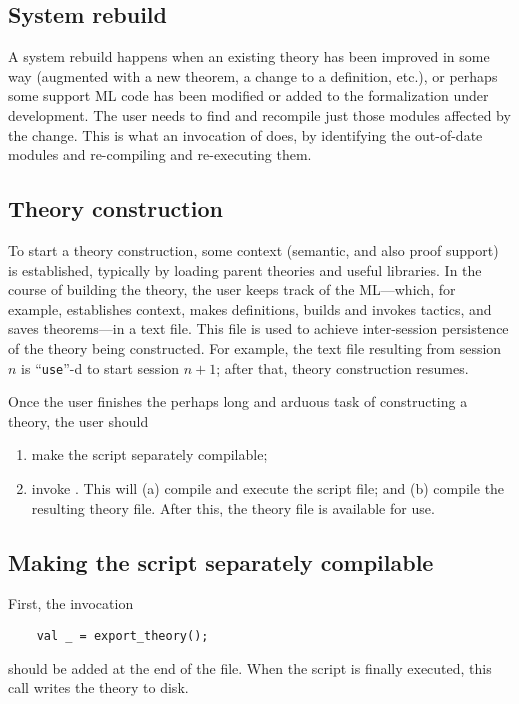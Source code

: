 \subsection{System rebuild}

A system rebuild happens when an existing theory has been improved in
some way (augmented with a new theorem, a change to a definition,
etc.), or perhaps some support ML code has been modified or added to
the formalization under development. The user needs to find and
recompile just those modules affected by the change. This is what an
invocation of \holmake{} does, by identifying the out-of-date modules
and re-compiling and re-executing them.


\subsection{Theory construction}

To start a theory construction, some context (semantic, and also proof
support) is established, typically by loading parent theories and
useful libraries. In the course of building the theory, the user keeps
track of the ML---which, for example, establishes context, makes
definitions, builds and invokes tactics, and saves theorems---in a
text file. This file is used to achieve inter-session persistence of
the theory being constructed.  For example, the text file resulting
from session $n$ is ``\verb+use+''-d to start session $n+1$; after
that, theory construction resumes.

Once the user finishes the perhaps long and arduous task of constructing
a theory, the user should
\begin{enumerate}
\item make the script separately compilable;
\item invoke \holmake{}. This will (a) compile and execute the
  script file; and (b) compile the resulting theory file. After this,
  the theory file is available for use.
\end{enumerate}

\subsection{Making the script separately compilable}

First, the invocation
\begin{verbatim}
    val _ = export_theory();
\end{verbatim}
should be added at the end of the file. When the script is finally
executed, this call writes the theory to disk.

